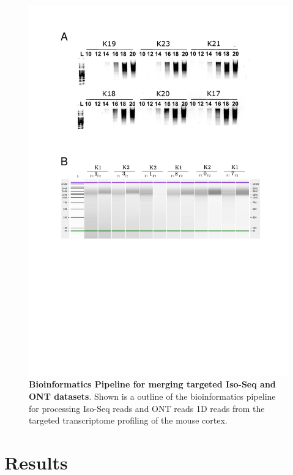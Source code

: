 \begin{figure}[htp]
	\centering
	\includegraphics[page=5,trim={0.5cm 7cm 0cm 0cm},clip,scale = 0.8]{Figures/TargetedTranscriptome_LabResults}
	\captionsetup{width=0.95\textwidth,singlelinecheck=off}
	\caption[Bioinformatics Pipeline for merging targeted Iso-Seq and ONT datasets]%
	{\textbf{Bioinformatics Pipeline for merging targeted Iso-Seq and ONT datasets}. Shown is a outline of the bioinformatics pipeline for processing Iso-Seq reads and ONT reads 1D reads from the targeted transcriptome profiling of the mouse cortex. 
	}
	\label{fig:Targeted_bioinformatics_pipeline}
\end{figure}

\newpage
\section{Results}
